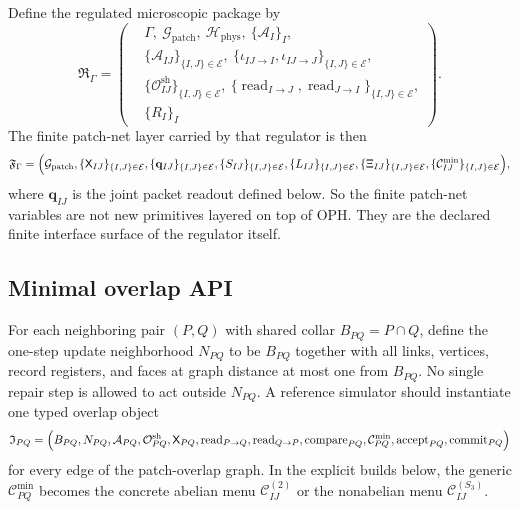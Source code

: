 \documentclass[11pt]{article}
\begin{document}
Define the regulated microscopic package by
\begin{equation}
\mathfrak R_{\Gamma}
=
\left(
\begin{aligned}
&\Gamma,\ \mathcal G_{\mathrm{patch}},\ \mathcal H_{\mathrm{phys}},\ \{\mathcal A_I\}_I,\\
&\{\mathcal A_{IJ}\}_{\{I,J\}\in\mathcal E},
\ \{\iota_{IJ\to I},\iota_{IJ\to J}\}_{\{I,J\}\in\mathcal E},\\
&\{\mathcal O_{IJ}^{\mathrm{sh}}\}_{\{I,J\}\in\mathcal E},
\ \{\operatorname{read}_{I\to J},\operatorname{read}_{J\to I}\}_{\{I,J\}\in\mathcal E},\\
&\{R_I\}_I
\end{aligned}
\right).
\end{equation}
The finite patch-net layer carried by that regulator is then
\begin{equation}
\mathfrak F_{\Gamma}
=
\Bigl(
\mathcal G_{\mathrm{patch}},
\{\mathsf X_{IJ}\}_{\{I,J\}\in\mathcal E},
\{\mathbf q_{IJ}\}_{\{I,J\}\in\mathcal E},
\{S_{IJ}\}_{\{I,J\}\in\mathcal E},
\{L_{IJ}\}_{\{I,J\}\in\mathcal E},
\{\Xi_{IJ}\}_{\{I,J\}\in\mathcal E},
\{\mathcal C_{IJ}^{\mathrm{min}}\}_{\{I,J\}\in\mathcal E}
\Bigr),
\end{equation}
where $\mathbf q_{IJ}$ is the joint packet readout defined below. So the finite patch-net
variables are not new primitives layered on top of OPH. They are the declared finite interface
surface of the regulator itself.

\subsection{Minimal overlap API}

For each neighboring pair $(P,Q)$ with shared collar $B_{PQ}=P\cap Q$, define the one-step
update neighborhood $N_{PQ}$ to be $B_{PQ}$ together with all links, vertices, record registers,
and faces at graph distance at most one from $B_{PQ}$. No single repair step is allowed to act
outside $N_{PQ}$. A reference simulator should instantiate one typed overlap object
\begin{equation}
\mathfrak I_{PQ}
=
\Bigl(
B_{PQ},
N_{PQ},
\mathcal A_{PQ},
\mathcal O^{\mathrm{sh}}_{PQ},
\mathsf X_{PQ},
\operatorname{read}_{P\to Q},
\operatorname{read}_{Q\to P},
\operatorname{compare}_{PQ},
\mathcal C^{\mathrm{min}}_{PQ},
\operatorname{accept}_{PQ},
\operatorname{commit}_{PQ}
\Bigr)
\end{equation}
for every edge of the patch-overlap graph. In the explicit builds below, the generic
$\mathcal C^{\mathrm{min}}_{PQ}$ becomes the concrete abelian menu
$\mathcal C^{(2)}_{IJ}$ or the nonabelian menu $\mathcal C^{(S_3)}_{IJ}$.
\end{document}
